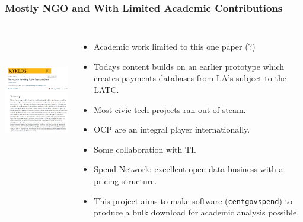 \documentclass[11pt]{beamer}
\begin{document}
\begin{frame}
\frametitle{Mostly NGO and With Limited Academic Contributions}
       \begin{columns}
             \centering
             \includegraphics[height=6cm, width = 5.5cm]{kyklos.png}
\begin{itemize}
\footnotesize
\item Academic work limited to this one paper (?)\vspace{0.025in}
\item Todays content builds on an earlier prototype which creates payments databases from LA's subject to the LATC.\vspace{0.025in}
\item Most civic tech projects ran out of steam.\vspace{0.025in}
\item OCP are an integral player internationally.\vspace{0.025in}
\item Some collaboration with TI.\vspace{0.025in}
\item Spend Network: excellent open data business with a pricing structure.\vspace{0.025in}
\item This project aims to make software (\texttt{centgovspend}) to produce a bulk download for academic analysis possible.\vspace{0.025in}
\end{itemize}
         \end{columns} 
    \end{frame}
\end{document}

